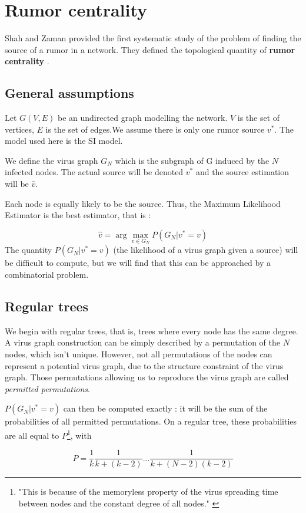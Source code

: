 \documentclass[10pt,a4paper]{article}
\begin{document}
\section{Rumor centrality}
Shah and Zaman provided the first systematic study of the problem of finding the source of a rumor in a network. They defined the topological quantity of \textbf{rumor centrality} .

\subsection{General assumptions}
Let $G(V, E)$ be an undirected graph modelling the network. $V$ is the set of vertices, $E$ is the set of edges.We assume there is only one rumor source $v^{*}$. The model used here is the SI model.

We define the virus graph $G_{N}$ which is the subgraph of G induced by the $N$ infected nodes. The actual source will be denoted $v^{*}$ and the source estimation will be $\hat{v}$.

Each node is equally likely to be the source.
Thus, the Maximum Likelihood Estimator is the best estimator, that is :

\[ \hat{v} = \arg \max_{v \in G_N} P(G_{N} | v^{*} = v) \]
The quantity $P(G_{N} | v^{*} = v)$ (the likelihood of a virus graph given a source) will be difficult to compute, but we will find that this can be approached by a combinatorial problem.

\subsection{Regular trees}

We begin with regular trees, that is, trees where every node has the same degree. A virus graph construction can be simply described by a permutation of the $N$ nodes, which isn't unique. However, not all permutations of the nodes can represent a potential virus graph, due to the structure constraint of the virus graph. Those permutations allowing us to reproduce the virus graph are called \textit{permitted permutations}.

$P(G_{N} | v^{*} = v)$ can then be computed exactly : it will be the sum of the probabilities of all permitted permutations. On a regular tree, these probabilities are all equal to $P$\footnote{"This is because of the memoryless property of the virus spreading time between nodes and the constant degree of all nodes." \cite{shah1}}, with

\[ P = \frac{1}{k} \frac{1}{k + (k-2)} ... \frac{1}{k+(N-2)(k-2)}\]
\end{document}
